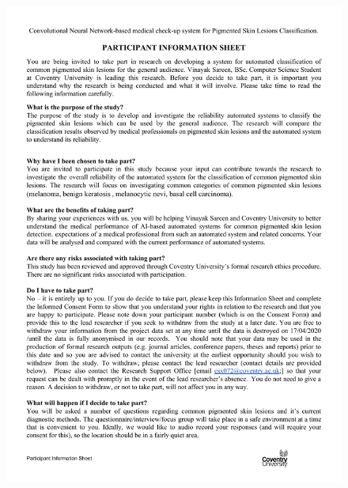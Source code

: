 \section*{}
\begin{figure}[!htp]
    \centering
    \includegraphics[width=15cm]{Documents/participation.pdf}
\end{figure}
